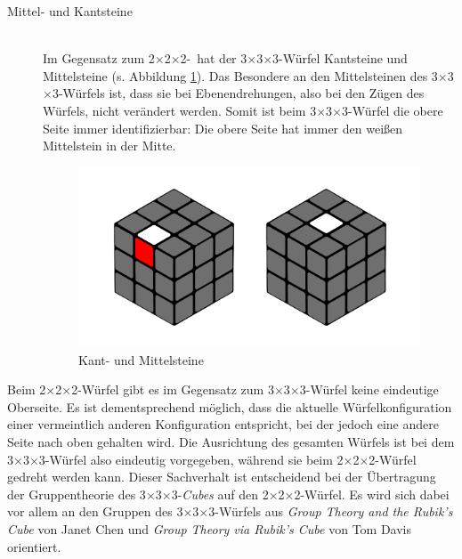\documentclass[12pt,a4paper, usenames, dvipsnames]{article}
\theoremstyle{mystyle}
\theoremstyle{definition}
\newcommand{\Ttwo}{2$\times$2$\times$2-}
\newcommand{\Tthree}{3$\times$3$\times$3-}
\begin{document}
\begin{description}
\newpage
\item[Mittel- und Kantsteine] \ \\
Im Gegensatz zum \Ttwo \ hat der \Tthree Würfel Kantsteine und Mittelsteine (s. Abbildung \ref{Abbildung_MittelKantSteine}).
Das Besondere an den Mittelsteinen des \Tthree Würfels ist, dass sie bei Ebenendrehungen, also bei den Zügen des Würfels, nicht verändert werden. Somit ist beim \Tthree Würfel die obere Seite immer identifizierbar: Die obere Seite hat immer den weißen Mittelstein in der Mitte. 
\begin{figure}[H]
\centering
\includegraphics[scale=0.11]{mittelkant.png}
\caption[Kant- und Mittelsteine]{Kant- und Mittelsteine}
\label{Abbildung_MittelKantSteine}
\end{figure}



\end{description}

Beim \Ttwo Würfel gibt es im Gegensatz zum \Tthree Würfel keine eindeutige Oberseite. Es ist dementsprechend möglich, dass die aktuelle Würfelkonfiguration einer vermeintlich anderen Konfiguration entspricht, bei der jedoch eine andere Seite nach oben gehalten wird.
Die Ausrichtung des gesamten Würfels ist bei dem \Tthree Würfel also eindeutig vorgegeben, während sie beim \Ttwo Würfel gedreht werden kann.  
Dieser Sachverhalt ist entscheidend bei der Übertragung der Gruppentheorie des \Tthree \textit{Cubes} auf den \Ttwo Würfel. Es wird sich dabei vor allem an den Gruppen des \Tthree Würfels aus \textit{Group Theory and the Rubik's Cube} von Janet Chen \cite{JC} und \textit{Group Theory via Rubik's Cube} von Tom Davis \cite{TD} orientiert.

%
%
%
%
%
%
%
%
%
%
%
%
%
\end{document}
